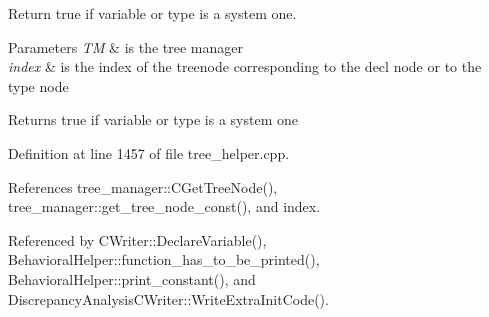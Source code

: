 Return true if variable or type is a system one. 


\begin{DoxyParams}{Parameters}
{\em TM} & is the tree manager \\
\hline
{\em index} & is the index of the treenode corresponding to the decl node or to the type node \\
\hline
\end{DoxyParams}
\begin{DoxyReturn}{Returns}
true if variable or type is a system one 
\end{DoxyReturn}


Definition at line 1457 of file tree\+\_\+helper.\+cpp.



References tree\+\_\+manager\+::\+C\+Get\+Tree\+Node(), tree\+\_\+manager\+::get\+\_\+tree\+\_\+node\+\_\+const(), and index.



Referenced by C\+Writer\+::\+Declare\+Variable(), Behavioral\+Helper\+::function\+\_\+has\+\_\+to\+\_\+be\+\_\+printed(), Behavioral\+Helper\+::print\+\_\+constant(), and Discrepancy\+Analysis\+C\+Writer\+::\+Write\+Extra\+Init\+Code().

